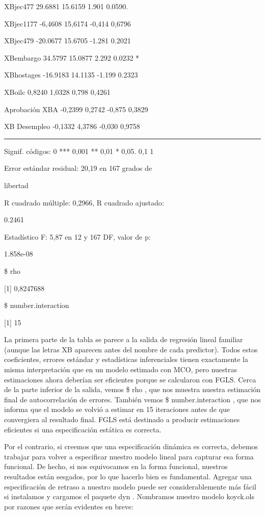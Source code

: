 \documentclass[
]{book}
\begin{document}
XBjec477 29.6881 15.6159 1.901 0.0590.

XBjec1177 -6,4608 15,6174 -0,414 0,6796

XBjec479 -20.0677 15.6705 -1.281 0.2021

XBembargo 34.5797 15.0877 2.292 0.0232 *

XBhostages -16.9183 14.1135 -1.199 0.2323

XBoilc 0,8240 1,0328 0,798 0,4261

Aprobación XBA -0,2399 0,2742 -0,875 0,3829

XB Desempleo -0,1332 4,3786 -0,030 0,9758

\begin{center}\rule{0.5\linewidth}{0.5pt}\end{center}

Signif. códigos: 0 *** 0,001 ** 0,01 * 0,05. 0,1 1

Error estándar residual: 20,19 en 167 grados de

libertad

R cuadrado múltiple: 0,2966, R cuadrado ajustado:

0.2461

Estadístico F: 5,87 en 12 y 167 DF, valor de p:

1.858e-08

\$ rho

{[}1{]} 0,8247688

\$ number.interaction

{[}1{]} 15

La primera parte de la tabla se parece a la salida de regresión lineal familiar (aunque las letras XB aparecen antes del nombre de cada predictor). Todos estos coeficientes, errores estándar y estadísticas inferenciales tienen exactamente la misma interpretación que en un modelo estimado con MCO, pero nuestras estimaciones ahora deberían ser eficientes porque se calcularon con FGLS. Cerca de la parte inferior de la salida, vemos \$ rho , que nos muestra nuestra estimación final de autocorrelación de errores. También vemos \$ number.interaction , que nos informa que el modelo se volvió a estimar en 15 iteraciones antes de que convergiera al resultado final. FGLS está destinado a producir estimaciones eficientes si una especificación estática es correcta.

Por el contrario, si creemos que una especificación dinámica es correcta, debemos trabajar para volver a especificar nuestro modelo lineal para capturar esa forma funcional. De hecho, si nos equivocamos en la forma funcional, nuestros resultados están sesgados, por lo que hacerlo bien es fundamental. Agregar una especificación de retraso a nuestro modelo puede ser considerablemente más fácil si instalamos y cargamos el paquete dyn . Nombramos nuestro modelo koyck.ols por razones que serán evidentes en breve:
\end{document}
